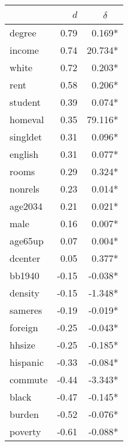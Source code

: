 \begin{tabular}{lrr}
	\toprule
	{}       &   $d$ & $\delta$~~ \\ \midrule
	degree   &  0.79 &     0.169* \\
	income   &  0.74 &    20.734* \\
	white    &  0.72 &     0.203* \\
	rent     &  0.58 &     0.206* \\
	student  &  0.39 &     0.074* \\
	homeval  &  0.35 &    79.116* \\
	singldet &  0.31 &     0.096* \\
	english  &  0.31 &     0.077* \\
	rooms    &  0.29 &     0.324* \\
	nonrels  &  0.23 &     0.014* \\
	age2034  &  0.21 &     0.021* \\
	male     &  0.16 &     0.007* \\
	age65up  &  0.07 &     0.004* \\
	dcenter  &  0.05 &     0.377* \\
	bb1940   & -0.15 &    -0.038* \\
	density  & -0.15 &    -1.348* \\
	sameres  & -0.19 &    -0.019* \\
	foreign  & -0.25 &    -0.043* \\
	hhsize   & -0.25 &    -0.185* \\
	hispanic & -0.33 &    -0.084* \\
	commute  & -0.44 &    -3.343* \\
	black    & -0.47 &    -0.145* \\
	burden   & -0.52 &    -0.076* \\
	poverty  & -0.61 &    -0.088* \\ \bottomrule
\end{tabular}
